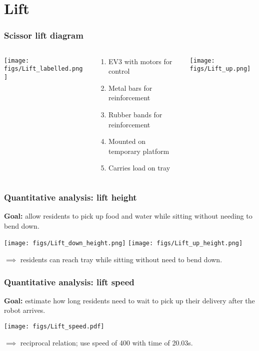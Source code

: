 \documentclass{beamer}
\begin{document}
\section{Lift}
\begin{frame}
  \frametitle{Scissor lift diagram}
  \begin{columns}
    \begin{column}{0.3\textwidth}
      \begin{center}
        \texttt{[image: figs/Lift\_labelled.png]}
      \end{center}
    \end{column}
    \begin{column}{0.3\textwidth}
      \begin{center}
      \begin{enumerate}
        \item EV3 with motors for control
        \item Metal bars for reinforcement
        \item Rubber bands for reinforcement
        \item Mounted on temporary platform
        \item Carries load on tray
        \end{enumerate}
      \end{center}
    \end{column}
    \begin{column}{0.3\textwidth}
      \begin{center}
        \texttt{[image: figs/Lift\_up.png]}
      \end{center}
    \end{column}
  \end{columns}
\end{frame}


\begin{frame}
  \frametitle{Quantitative analysis: lift height}
  {\bf Goal: } allow residents to pick up food and water while sitting without needing to bend down.
  \begin{center}
    \texttt{[image: figs/Lift\_down\_height.png]}
    \texttt{[image: figs/Lift\_up\_height.png]}
  \end{center}
  $\implies$ residents can reach tray while sitting without need to bend down. 
\end{frame}

\begin{frame}
  \frametitle{Quantitative analysis: lift speed}
  {\bf Goal: } estimate how long residents need to wait to pick up their delivery after the robot arrives.
  \begin{center}
    \texttt{[image: figs/Lift\_speed.pdf]}
  \end{center}
  $\implies$ reciprocal relation; use speed of 400 with time of 20.03s.
\end{frame}
\end{document}
